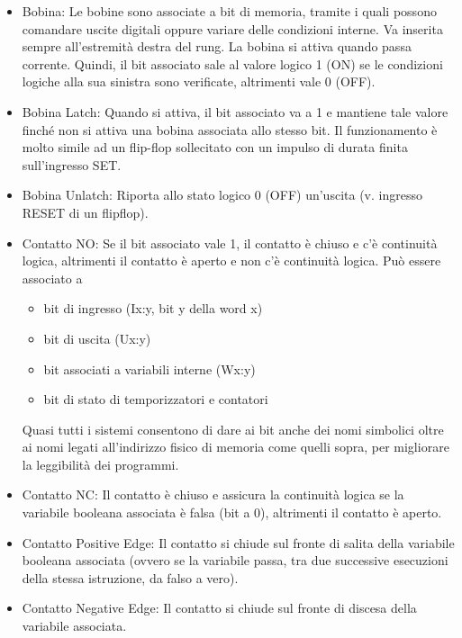 \documentclass[12pt, a4paper, oneside]{book}
\begin{document}
\begin{itemize}
	
	\item Bobina: Le bobine sono associate a bit di memoria, tramite i quali possono comandare uscite digitali oppure variare delle condizioni interne. Va inserita sempre all’estremità destra del rung. La bobina si attiva quando
	passa corrente. Quindi, il bit associato sale al valore logico 1 (ON) se le
	condizioni logiche alla sua sinistra sono verificate, altrimenti vale 0 (OFF).
	
	\item Bobina Latch: Quando si attiva, il bit associato va a 1 e mantiene tale valore finché non si
	attiva una bobina associata allo stesso bit.
	Il funzionamento è molto simile ad un flip-flop sollecitato con un impulso
	di durata finita sull’ingresso SET. 
	
	\item Bobina Unlatch: Riporta allo stato logico 0 (OFF) un’uscita (v. ingresso RESET di un flipflop).
	
	\item Contatto NO: Se il bit associato vale 1, il contatto è chiuso e c’è continuità logica,
	altrimenti il contatto è aperto e non c’è continuità logica.
	Può essere associato a
	\begin{itemize}
	\item bit di ingresso (Ix:y, bit y della word x)
	\item bit di uscita (Ux:y)
	\item bit associati a variabili interne (Wx:y)
	\item bit di stato di temporizzatori e contatori
	\end{itemize}
	Quasi tutti i sistemi consentono di dare ai bit anche dei nomi
	simbolici oltre ai nomi legati all’indirizzo fisico di memoria come
	quelli sopra, per migliorare la leggibilità dei programmi. 
	
	\item Contatto NC: Il contatto è chiuso e assicura la continuità logica se la variabile booleana associata è falsa (bit a 0), altrimenti il contatto è aperto. 
	
	\item Contatto Positive Edge: Il contatto si chiude sul fronte di salita della variabile booleana
	associata (ovvero se la variabile passa, tra due successive esecuzioni
	della stessa istruzione, da falso a vero). 
	
	\item Contatto Negative Edge: Il contatto si chiude sul fronte di discesa della variabile associata. 
	

\end{itemize}
\end{document}
